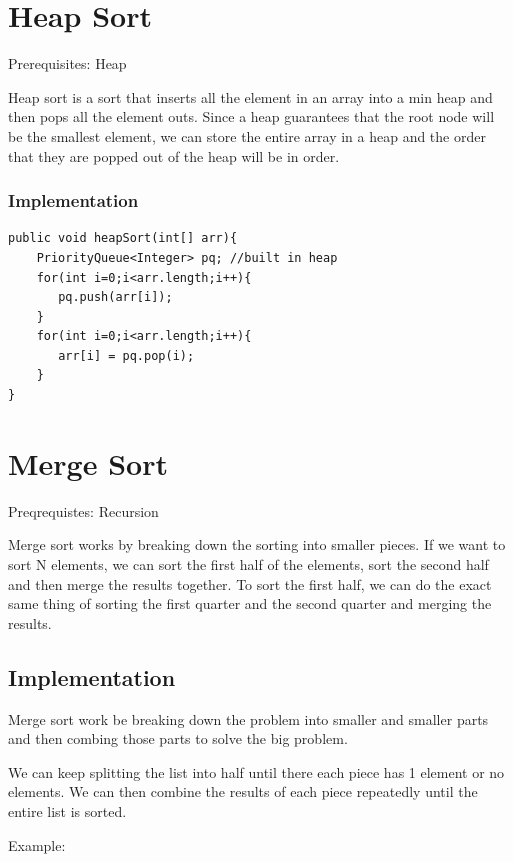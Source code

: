 \documentclass[11pt,oneside]{book}
\begin{document}
        \section{ Heap Sort }
        

Prerequisites: Heap

Heap sort is a sort that inserts all the element in an array into a min heap and then pops all the element outs. Since a heap guarantees that the root node will be the smallest element, we can store the entire array in a heap and the order that they are popped out of the heap will be in order.

\subsubsection{Implementation}

\begin{lstlisting}
public void heapSort(int[] arr){
    PriorityQueue<Integer> pq; //built in heap
    for(int i=0;i<arr.length;i++){
       pq.push(arr[i]);
    }
    for(int i=0;i<arr.length;i++){
       arr[i] = pq.pop(i);
    }
}
\end{lstlisting}

        \section{ Merge Sort }
        

Preqrequistes: Recursion

Merge sort works by breaking down the sorting into smaller pieces. If we want to sort N elements, we can sort the first half of the elements, sort the second half and then merge the results together. To sort the first half, we can do the exact same thing of sorting the first quarter and the second quarter and merging the results.

\subsection{Implementation}

Merge sort work be breaking down the problem into smaller and smaller parts and then combing those parts to solve the big problem.

We can keep splitting the list into half until there each piece has 1 element or no elements. We can then combine the results of each piece repeatedly until the entire list is sorted.

Example:
\end{document}
